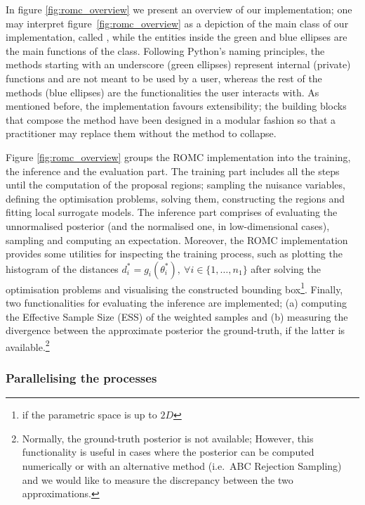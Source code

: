 In figure \ref{fig:romc_overview} we present an overview of our
implementation; one may interpret figure~\ref{fig:romc_overview} as a
depiction of the main class of our implementation, called
, while the entities inside the green and blue
ellipses are the main functions of the class. Following Python's
naming principles, the methods starting with an underscore (green
ellipses) represent internal (private) functions and are not meant to
be used by a user, whereas the rest of the methods (blue ellipses) are
the functionalities the user interacts with. As mentioned before, the
implementation favours extensibility; the building blocks that compose
the method have been designed in a modular fashion so that a
practitioner may replace them without the method to collapse.

Figure \ref{fig:romc_overview} groups the ROMC implementation into the
training, the inference and the evaluation part. The training part includes all the
steps until the computation of the proposal regions; sampling the
nuisance variables, defining the optimisation problems, solving them,
constructing the regions and fitting local surrogate models. The
inference part comprises of evaluating the unnormalised posterior (and
the normalised one, in low-dimensional cases), sampling and computing
an expectation. Moreover, the ROMC implementation provides some
utilities for inspecting the training process, such as plotting the
histogram of the distances
$d^*_i = g_i(\theta_i^*), \: \forall i \in \{1, \ldots, n_1 \}$ after
solving the optimisation problems and visualising the constructed
bounding box\footnote{if the parametric space is up to $2D$}. Finally,
two functionalities for evaluating the inference are implemented; (a)
computing the Effective Sample Size (ESS) of the weighted samples and
(b) measuring the divergence between the approximate posterior the
ground-truth, if the latter is available.\footnote{Normally, the
  ground-truth posterior is not available; However, this functionality
  is useful in cases where the posterior can be computed numerically
  or with an alternative method (i.e.\ ABC Rejection Sampling) and we
  would like to measure the discrepancy between the two
  approximations.}
  
\subsubsection*{Parallelising the processes}

